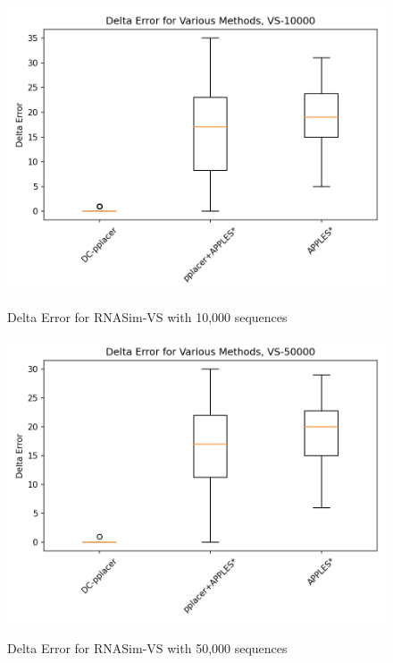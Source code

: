 \documentclass[10pt]{article}
\begin{document}
\begin{figure}[h]
\centering
\includegraphics[width=\textwidth]{Figs/VS-delta-error-10000.png}
\label{fig:error10000}
\caption{Delta Error for RNASim-VS with 10,000 sequences}
\end{figure}

\begin{figure}[h]
\centering
\includegraphics[width=\textwidth]{Figs/VS-delta-error-50000.png}
\label{fig:error50000}
\caption{Delta Error for RNASim-VS with 50,000 sequences}
\end{figure}

\end{document}
